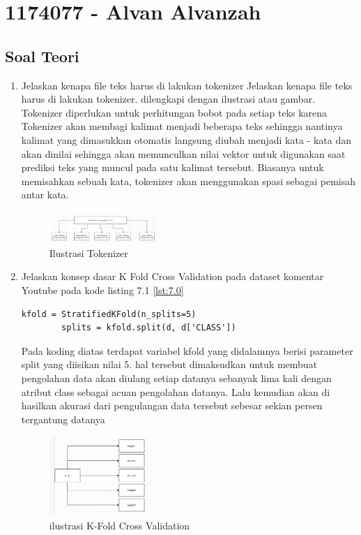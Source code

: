 \section{1174077 - Alvan Alvanzah}
\subsection{Soal Teori}
\begin{enumerate}

	\item Jelaskan kenapa ﬁle teks harus di lakukan tokenizer
	\hfill\break
    Jelaskan kenapa file teks harus di lakukan tokenizer. dilengkapi dengan ilustrasi atau gambar. 
    \hfill \break
    Tokenizer diperlukan untuk perhitungan bobot pada setiap teks karena Tokenizer akan membagi kalimat menjadi beberapa teks sehingga nantinya kalimat yang dimasukkan otomatis langsung diubah menjadi kata - kata dan akan dinilai sehingga akan memunculkan nilai vektor untuk digunakan saat prediksi teks yang muncul pada satu kalimat tersebut. Biasanya untuk memisahkan sebuah kata, tokenizer akan menggunakan spasi sebagai pemisah antar kata.
    
    \begin{figure}[H]
	\centering
		\includegraphics[width=4cm]{figures/1174077/7/teori_1.PNG}
		\caption{Ilustrasi Tokenizer}
	\end{figure}

	\item Jelaskan konsep dasar K Fold Cross Validation pada dataset komentar Youtube pada kode listing 7.1 \ref{lst:7.0}
    \begin{lstlisting}[caption=K Fold Cross Validation,label={lst:7.0}]
        kfold = StratifiedKFold(n_splits=5)
        splits = kfold.split(d, d['CLASS'])
        \end{lstlisting}
    \hfill\break
    Pada koding diatas terdapat variabel kfold yang didalamnya berisi parameter split yang diisikan nilai 5. hal tersebut dimaksudkan untuk membuat pengolahan data akan diulang setiap datanya sebanyak lima kali dengan atribut class sebagai acuan pengolahan datanya. Lalu kemudian akan di hasilkan akurasi dari pengulangan data tersebut sebesar sekian persen tergantung datanya	
    \begin{figure}[H]
	\centering
		\includegraphics[width=4cm]{figures/1174077/7/teori_2.PNG}
		\caption{ilustrasi K-Fold Cross Validation}
	\end{figure}


\end{enumerate}
